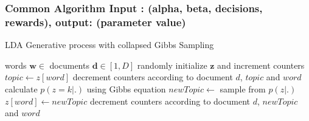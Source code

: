 \subsubsection{Common Algorithm Input : (alpha, beta, decisions, rewards), output: (parameter value)}
\label{appendixAlgo}
\begin{algorithm}[H]
\caption{LDA Generative process with collapsed Gibbs Sampling }
\label{generativeLDA_algorithm}
\renewcommand{\algorithmicrequire}{\textbf{Input:}}
\renewcommand{\algorithmicensure}{\textbf{Output:}}
\begin{algorithmic}[1]
		\REQUIRE words $\bm{w} \in $ documents $\bm{d} \in [1,D]$
			\STATE randomly initialize $\bm{z}$ and increment counters
					\STATE $topic \leftarrow z[word]$
					\STATE decrement counters according to document $d$, $topic$ and $word$
						\STATE calculate $p(z=k|.) $ using Gibbs equation
					\ENDFOR
					\STATE $newTopic \leftarrow $ sample from $p(z|.)$
					\STATE $z[word] \leftarrow newTopic$
					\STATE decrement counters according to document $d$, $newTopic$ and $word$
				\ENDFOR
			\ENDFOR
		\ENDFOR
\end{algorithmic}
\end{algorithm}
	
